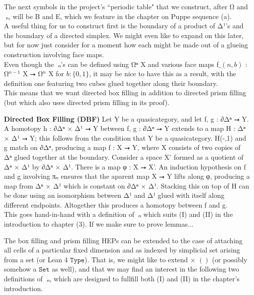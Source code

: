 \documentclass{book}
\theoremstyle{definition}
\begin{document}
The next symbols in the project's ``periodic table" that we construct, after Ω⃗ and π⃗ₙ, will be B⃗ and E⃗, which we feature in the chapter on Puppe sequence (a).\\

A useful thing for us to construct first is the boundary of a product of Δ¹'s and the boundary of a directed simplex. We might even like to expand on this later, but for now just consider for a moment how each might be made out of a glueing construction involving face maps.\\

Even though the π⃗ₙ's can be defined using Ω⃗ⁿ X and various face maps f$\_(n,b)$ : Ω⃗${}^{n-1}$ X ⭢ Ω⃗${}^{n}$ X for $b : \{ 0, 1 \}$, it may be nice to have this as a result, with the definition one featuring two cubes glued together along their boundary.\\

This means that we want directed box filling in addition to directed prism filling (but which also uses directed prism filling in its proof).

{\bf Directed Box Filling (DBF)} Let Y be a quasicategory, and let f, g : ∂Δⁿ ⭢ Y. A homotopy h : ∂Δⁿ × Δ¹ ⭢ Y between f, g : ∂Δⁿ ⭢ Y extends to a map H : Δⁿ × Δ¹ ⭢ Y; this follows from the condition that Y be a quasicategory. H(-,1) and g match on ∂Δⁿ, producing a map f : X ⭢ Y, where X consists of two copies of Δⁿ glued together at the boundary. Consider a space X' formed as a quotient of Δⁿ × Δ¹ by ∂Δⁿ × Δ¹. There is a map φ : X ⭢ X'. An induction hypothesis on f and g involving πₙ ensures that the aparent map X ⭢ Y lifts along φ, producing a map from Δⁿ × Δ¹ which is constant on ∂Δⁿ × Δ¹. Stacking this on top of H can be done using an isomorphism between Δ¹ and Δ¹ glued with itself along different endpoints. Altogether this produces a homotopy between f and g.\\

This goes hand-in-hand with a definition of π⃗ₙ which suits (I) and (II) in the introduction to chapter (3). If we make sure to prove lemmas... 

The box filling and prism filling HEPs can be extended to the case of attaching all cells of a particular fixed dimension and as indexed by simplicial set arising from a set (or Lean 4 $\texttt{Type}$). That is, we might like to extend × $()$ (or possibly somehow a $\texttt{Set}$ as well), and that we may find an interest in the following two definitions of π⃗ₙ, which are designed to fullfill both (I) and (II) in the chapter's introduction.\\
\end{document}
